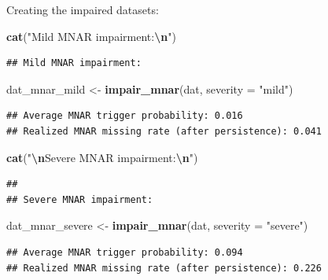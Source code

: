 \documentclass[
]{article}
\newenvironment{Shaded}{\begin{snugshade}}{\end{snugshade}}
\newcommand{\AttributeTok}[1]{\textcolor[rgb]{0.13,0.29,0.53}{#1}}
\newcommand{\FunctionTok}[1]{\textcolor[rgb]{0.13,0.29,0.53}{\textbf{#1}}}
\newcommand{\NormalTok}[1]{#1}
\newcommand{\OtherTok}[1]{\textcolor[rgb]{0.56,0.35,0.01}{#1}}
\newcommand{\SpecialCharTok}[1]{\textcolor[rgb]{0.81,0.36,0.00}{\textbf{#1}}}
\newcommand{\StringTok}[1]{\textcolor[rgb]{0.31,0.60,0.02}{#1}}
\begin{document}
Creating the impaired datasets:

\begin{Shaded}
\begin{Highlighting}[]
\FunctionTok{cat}\NormalTok{(}\StringTok{"Mild MNAR impairment:}\SpecialCharTok{\textbackslash{}n}\StringTok{"}\NormalTok{)}
\end{Highlighting}
\end{Shaded}

\begin{verbatim}
## Mild MNAR impairment:
\end{verbatim}

\begin{Shaded}
\begin{Highlighting}[]
\NormalTok{dat\_mnar\_mild   }\OtherTok{\textless{}{-}} \FunctionTok{impair\_mnar}\NormalTok{(dat, }\AttributeTok{severity =} \StringTok{"mild"}\NormalTok{)}
\end{Highlighting}
\end{Shaded}

\begin{verbatim}
## Average MNAR trigger probability: 0.016 
## Realized MNAR missing rate (after persistence): 0.041
\end{verbatim}

\begin{Shaded}
\begin{Highlighting}[]
\FunctionTok{cat}\NormalTok{(}\StringTok{"}\SpecialCharTok{\textbackslash{}n}\StringTok{Severe MNAR impairment:}\SpecialCharTok{\textbackslash{}n}\StringTok{"}\NormalTok{)}
\end{Highlighting}
\end{Shaded}

\begin{verbatim}
## 
## Severe MNAR impairment:
\end{verbatim}

\begin{Shaded}
\begin{Highlighting}[]
\NormalTok{dat\_mnar\_severe }\OtherTok{\textless{}{-}} \FunctionTok{impair\_mnar}\NormalTok{(dat, }\AttributeTok{severity =} \StringTok{"severe"}\NormalTok{)}
\end{Highlighting}
\end{Shaded}

\begin{verbatim}
## Average MNAR trigger probability: 0.094 
## Realized MNAR missing rate (after persistence): 0.226
\end{verbatim}
\end{document}
